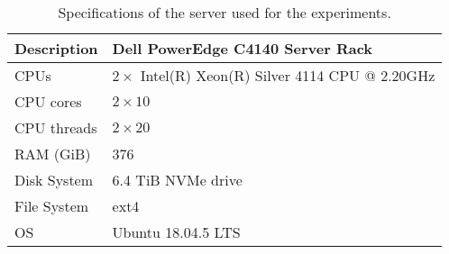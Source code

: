 \begin{table}
    \caption{\label{tab:server} Specifications of the server used for the
experiments.}
    \begin{tabular}{|l|l|}
        \hline
Description & Dell PowerEdge C4140 Server Rack\\
\hline
	    CPUs & $2\times$ Intel(R) Xeon(R) Silver 4114 CPU @ 2.20GHz\\
	    CPU cores & $2\times 10$\\
	    CPU threads & $2\times 20$\\
RAM (GiB) & 376 \\
Disk System & 6.4 TiB NVMe drive \\
File System & ext4 \\
OS & Ubuntu 18.04.5 LTS \\
	\hline
    \end{tabular}
\end{table}
